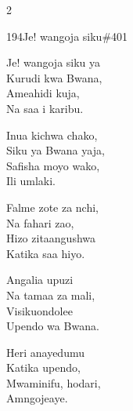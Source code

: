 \documentclass{article}
\begin{document}
\begin{multicols}{2}
\begin{hymn}{194}{Je! wangoja siku}{\#401}
\begin{stanza}
Je! wangoja siku ya\\
Kurudi kwa Bwana,\\
Ameahidi kuja,\\
Na saa i karibu.
\end{stanza}
\begin{chorus}
Inua kichwa chako,\\
Siku ya Bwana yaja,\\
Safisha moyo wako,\\
Ili umlaki.
\end{chorus}
\begin{stanza}
Falme zote za nchi,\\
Na fahari zao,\\
Hizo zitaangushwa\\
Katika saa hiyo.
\end{stanza}
\begin{stanza}
Angalia upuzi\\
Na tamaa za mali,\\
Visikuondolee\\
Upendo wa Bwana.
\end{stanza}
\begin{stanza}
Heri anayedumu\\
Katika upendo,\\
Mwaminifu, hodari,\\
Amngojeaye.
\end{stanza}
\end{hymn}


\end{multicols}
\end{document}
